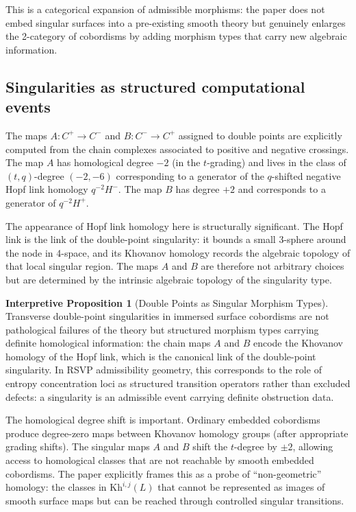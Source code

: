 \documentclass[12pt, a4paper]{article}
\theoremstyle{plain}
\theoremstyle{definition}
\theoremstyle{correspondence}
\newtheorem{interpprop}[theorem]{Interpretive Proposition}
\newcommand{\Kh}{\mathrm{Kh}}
\begin{document}
This is a categorical expansion of admissible morphisms: the paper does not embed
singular surfaces into a pre-existing smooth theory but genuinely enlarges the 2-category
of cobordisms by adding morphism types that carry new algebraic information.

\subsection{Singularities as structured computational events}

The maps $A : C^+ \to C^-$ and $B : C^- \to C^+$ assigned to double points are
explicitly computed from the chain complexes associated to positive and negative
crossings. The map $A$ has homological degree $-2$ (in the $t$-grading) and lives in
the class of $(t,q)$-degree $(-2,-6)$ corresponding to a generator of the
$q$-shifted negative Hopf link homology $q^{-2} H^-$. The map $B$ has degree $+2$
and corresponds to a generator of $q^{-2} H^+$.

The appearance of Hopf link homology here is structurally significant. The Hopf link
is the link of the double-point singularity: it bounds a small 3-sphere around the
node in 4-space, and its Khovanov homology records the algebraic topology of that
local singular region. The maps $A$ and $B$ are therefore not arbitrary choices but
are determined by the intrinsic algebraic topology of the singularity type.

\begin{interpprop}[Double Points as Singular Morphism Types]
\label{ip:double}
Transverse double-point singularities in immersed surface cobordisms are not
pathological failures of the theory but structured morphism types carrying definite
homological information: the chain maps $A$ and $B$ encode the Khovanov homology of
the Hopf link, which is the canonical link of the double-point singularity. In RSVP
admissibility geometry, this corresponds to the role of entropy concentration loci as
structured transition operators rather than excluded defects: a singularity is an
admissible event carrying definite obstruction data.
\end{interpprop}

The homological degree shift is important. Ordinary embedded cobordisms produce
degree-zero maps between Khovanov homology groups (after appropriate grading shifts).
The singular maps $A$ and $B$ shift the $t$-degree by $\pm 2$, allowing access to
homological classes that are not reachable by smooth embedded cobordisms. The paper
explicitly frames this as a probe of ``non-geometric'' homology: the classes in
$\Kh^{i,j}(L)$ that cannot be represented as images of smooth surface maps but can
be reached through controlled singular transitions.
\end{document}
